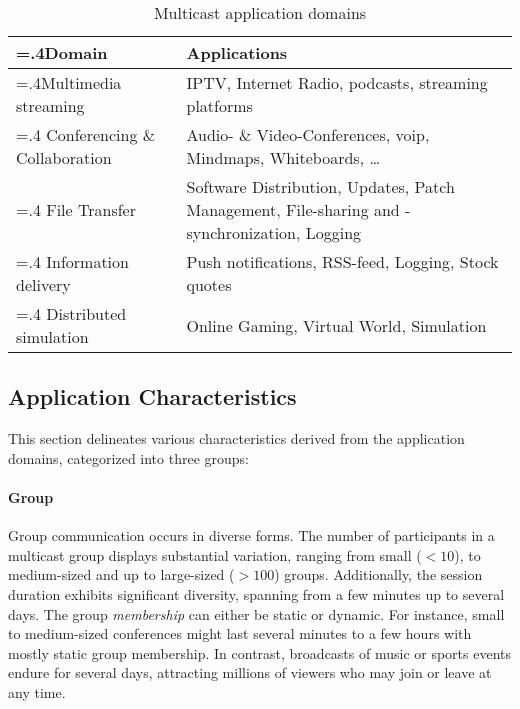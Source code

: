 
\begin{table}[h]
    \centering
    \begin{tabularx}{\textwidth}{>{\hsize=.4\hsize}XX}
    \toprule
        \textbf{Domain} & \textbf{Applications} \\
    \midrule
        Multimedia streaming &
        IPTV, Internet Radio, podcasts, streaming platforms
        \\\addlinespace
        Conferencing \& Collaboration &
        Audio- \& Video-Conferences, \gls{voip}, Mindmaps, Whiteboards, \dots
        \\\addlinespace
        File Transfer &
        Software Distribution, Updates, Patch Management, File-sharing and
            -synchronization, Logging
        \\\addlinespace
        Information delivery &
        Push notifications, RSS-feed, Logging, Stock quotes
        \\\addlinespace
        Distributed simulation &
        Online Gaming, Virtual World, Simulation \\

    \bottomrule
    \end{tabularx}
    \caption{Multicast application domains}
    \label{tab:mcappdom}
\end{table}

\subsection{Application Characteristics} %
\label{sub:Application Characteristics}
This section delineates various characteristics derived from the application
    domains, categorized into three groups:
\paragraph{Group} %
\label{par:Group}
Group communication occurs in diverse forms.
The number of participants in a multicast group displays substantial variation,
    ranging from small ($<10$), to medium-sized and up to large-sized ($>100$)
    groups.
Additionally, the session duration exhibits significant diversity, spanning
    from a few minutes up to several days.
The group \textit{membership} can either be static or dynamic.
For instance, small to medium-sized conferences might last several minutes
    to a few hours with mostly static group membership.
In contrast, broadcasts of music or sports events endure for several days,
    attracting millions of viewers who may join or leave at any time.

